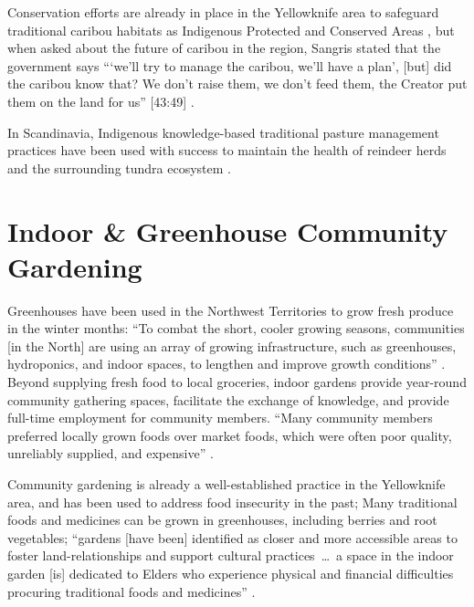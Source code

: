 \documentclass{report}
\begin{document}
\hspace{24pt} Conservation efforts are already in place in the Yellowknife area to safeguard traditional caribou habitats as Indigenous Protected and Conserved Areas \parencite{resilientcommunities}, but when asked about the future of caribou in the region, Sangris stated that the government says ```we'll try to manage the caribou, we'll have a plan', [but] did the caribou know that? We don't raise them, we don't feed them, the Creator put them on the land for us'' [43:49] \parencite{jonassangris}.

\hspace{24pt} In Scandinavia, Indigenous knowledge-based traditional pasture management practices have been used with success to maintain the health of reindeer herds and the surrounding tundra ecosystem \parencite{reindeerfoodsovereignty}. 

\section{Indoor \& Greenhouse Community Gardening}



\hspace{24pt} Greenhouses have been used in the Northwest Territories to grow fresh produce in the winter months: ``To combat the short, cooler growing seasons, communities [in the North] are using an array of growing infrastructure, such as greenhouses, hydroponics, and indoor spaces, to lengthen and improve growth conditions'' \parencite[90]{resilientcommunities}. Beyond supplying fresh food to local groceries, indoor gardens provide year-round community gathering spaces, facilitate the exchange of knowledge, and provide full-time employment for community members. ``Many community members preferred locally grown foods over market foods, which were often poor quality, unreliably supplied, and expensive'' \parencite[99]{resilientcommunities}.

\hspace{24pt} Community gardening is already a well-established practice in the Yellowknife area, and has been used to address food insecurity in the past; Many traditional foods and medicines can be grown in greenhouses, including berries and root vegetables; ``gardens [have been] identified as closer and more accessible areas to foster land-relationships and support cultural practices~\ldots~a space in the indoor garden [is] dedicated to Elders who experience physical and financial difficulties procuring traditional foods and medicines'' \parencite[99]{resilientcommunities}.
\end{document}
